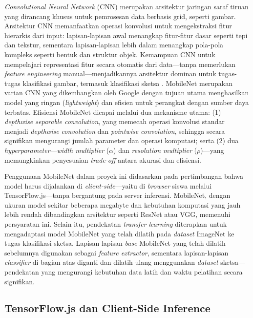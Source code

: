\documentclass[12pt,a4paper,oneside,openany]{report}
\begin{document}
\textit{Convolutional Neural Network} (CNN) merupakan arsitektur jaringan saraf tiruan yang dirancang khusus untuk pemrosesan data berbasis grid, seperti gambar. Arsitektur CNN memanfaatkan operasi konvolusi untuk mengekstraksi fitur hierarkis dari input: lapisan-lapisan awal menangkap fitur-fitur dasar seperti tepi dan tekstur, sementara lapisan-lapisan lebih dalam menangkap pola-pola kompleks seperti bentuk dan struktur objek. Kemampuan CNN untuk mempelajari representasi fitur secara otomatis dari data---tanpa memerlukan \textit{feature engineering} manual---menjadikannya arsitektur dominan untuk tugas-tugas klasifikasi gambar, termasuk klasifikasi sketsa \cite{ref6}. MobileNet merupakan varian CNN yang dikembangkan oleh Google dengan tujuan utama menghasilkan model yang ringan (\textit{lightweight}) dan efisien untuk perangkat dengan sumber daya terbatas. Efisiensi MobileNet dicapai melalui dua mekanisme utama: (1) \textit{depthwise separable convolution}, yang memecah operasi konvolusi standar menjadi \textit{depthwise convolution} dan \textit{pointwise convolution}, sehingga secara signifikan mengurangi jumlah parameter dan operasi komputasi; serta (2) dua \textit{hyperparameter}---\textit{width multiplier} ($\alpha$) dan \textit{resolution multiplier} ($\rho$)---yang memungkinkan penyesuaian \textit{trade-off} antara akurasi dan efisiensi.

Penggunaan MobileNet dalam proyek ini didasarkan pada pertimbangan bahwa model harus dijalankan di \textit{client-side}---yaitu di \textit{browser} siswa melalui TensorFlow.js---tanpa bergantung pada server inferensi. MobileNet, dengan ukuran model sekitar beberapa megabyte dan kebutuhan komputasi yang jauh lebih rendah dibandingkan arsitektur seperti ResNet atau VGG, memenuhi persyaratan ini. Selain itu, pendekatan \textit{transfer learning} diterapkan untuk mengadaptasi model MobileNet yang telah dilatih pada \textit{dataset} ImageNet ke tugas klasifikasi sketsa. Lapisan-lapisan \textit{base} MobileNet yang telah dilatih sebelumnya digunakan sebagai \textit{feature extractor}, sementara lapisan-lapisan \textit{classifier} di bagian atas diganti dan dilatih ulang menggunakan \textit{dataset} sketsa---pendekatan yang mengurangi kebutuhan data latih dan waktu pelatihan secara signifikan.

\subsection{TensorFlow.js dan Client-Side Inference}
\label{subsec:tfjs-client-side}
\end{document}
